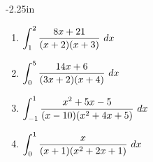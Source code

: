 \begin{adjustwidth*}{}{-2.25in}
\begin{multicols*}{2}

\begin{enumerate}[1),resume]
\item $\ds \int_1^2 \frac{8x+21}{(x+2)(x+3)}\ dx$
\item $\displaystyle \int_0^5 \frac{14x+6}{(3x+2)(x+4)}\ dx$
\item $\displaystyle \int_{-1}^1 \frac{x^2+5x-5}{(x-10)(x^2+4x+5)}\ dx$
\item $\displaystyle \int_{0}^1 \frac{x}{(x+1)(x^2+2x+1)}\ dx$
\end{enumerate}

\end{multicols*}
\end{adjustwidth*}

%
%
%

\afterexercises